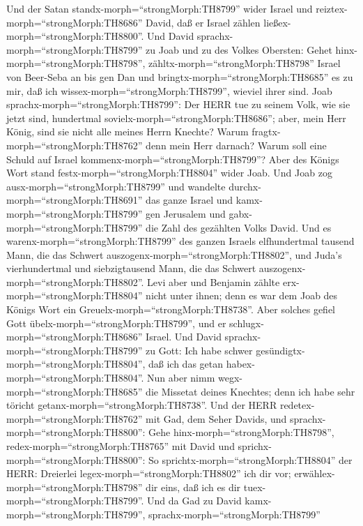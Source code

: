  Und der Satan standx-morph=``strongMorph:TH8799'' wider
Israel und reiztex-morph=``strongMorph:TH8686'' David, daß er Israel
zählen ließex-morph=``strongMorph:TH8800''.  Und David
sprachx-morph=``strongMorph:TH8799'' zu Joab und zu des Volkes Obersten:
Gehet hinx-morph=``strongMorph:TH8798'',
zähltx-morph=``strongMorph:TH8798'' Israel von Beer-Seba an bis gen Dan
und bringtx-morph=``strongMorph:TH8685'' es zu mir, daß ich
wissex-morph=``strongMorph:TH8799'', wieviel ihrer sind. 
Joab sprachx-morph=``strongMorph:TH8799'': Der HERR tue zu seinem Volk,
wie sie jetzt sind, hundertmal sovielx-morph=``strongMorph:TH8686'';
aber, mein Herr König, sind sie nicht alle meines Herrn Knechte? Warum
fragtx-morph=``strongMorph:TH8762'' denn mein Herr darnach? Warum soll
eine Schuld auf Israel kommenx-morph=``strongMorph:TH8799''?
 Aber des Königs Wort stand
festx-morph=``strongMorph:TH8804'' wider Joab. Und Joab zog
ausx-morph=``strongMorph:TH8799'' und wandelte
durchx-morph=``strongMorph:TH8691'' das ganze Israel und
kamx-morph=``strongMorph:TH8799'' gen Jerusalem  und
gabx-morph=``strongMorph:TH8799'' die Zahl des gezählten Volks David.
Und es warenx-morph=``strongMorph:TH8799'' des ganzen Israels
elfhundertmal tausend Mann, die das Schwert
auszogenx-morph=``strongMorph:TH8802'', und Juda's vierhundertmal und
siebzigtausend Mann, die das Schwert
auszogenx-morph=``strongMorph:TH8802''.  Levi aber und
Benjamin zählte erx-morph=``strongMorph:TH8804'' nicht unter ihnen; denn
es war dem Joab des Königs Wort ein
Greuelx-morph=``strongMorph:TH8738''.  Aber solches gefiel
Gott übelx-morph=``strongMorph:TH8799'', und er
schlugx-morph=``strongMorph:TH8686'' Israel.  Und David
sprachx-morph=``strongMorph:TH8799'' zu Gott: Ich habe schwer
gesündigtx-morph=``strongMorph:TH8804'', daß ich das getan
habex-morph=``strongMorph:TH8804''. Nun aber nimm
wegx-morph=``strongMorph:TH8685'' die Missetat deines Knechtes; denn ich
habe sehr töricht getanx-morph=``strongMorph:TH8738''.  Und
der HERR redetex-morph=``strongMorph:TH8762'' mit Gad, dem Seher Davids,
und sprachx-morph=``strongMorph:TH8800'':  Gehe
hinx-morph=``strongMorph:TH8798'', redex-morph=``strongMorph:TH8765''
mit David und sprichx-morph=``strongMorph:TH8800'': So
sprichtx-morph=``strongMorph:TH8804'' der HERR: Dreierlei
legex-morph=``strongMorph:TH8802'' ich dir vor;
erwählex-morph=``strongMorph:TH8798'' dir eins, daß ich es dir
tuex-morph=``strongMorph:TH8799''.  Und da Gad zu David
kamx-morph=``strongMorph:TH8799'', sprachx-morph=``strongMorph:TH8799''
